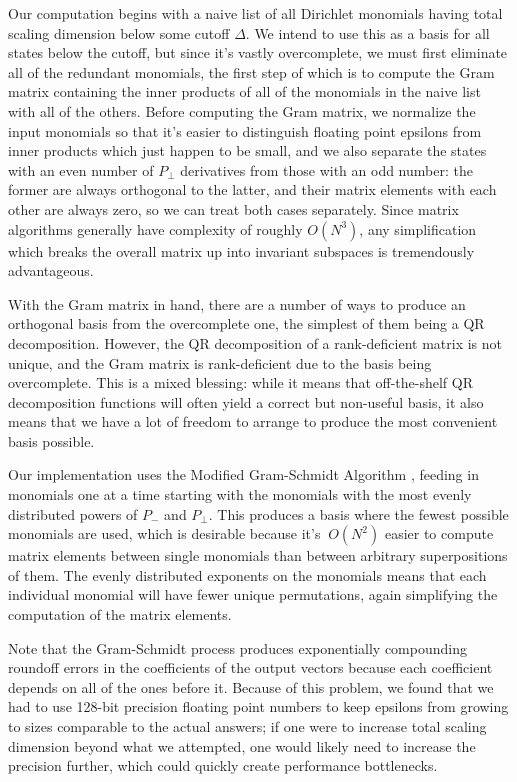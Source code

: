 \begin{subappendices}
Our computation begins with a naive list of all Dirichlet monomials having total 
scaling dimension below some cutoff $\Delta$. We intend to use this as a basis
for all states below the cutoff, but since it's vastly overcomplete, we must 
first eliminate all of the redundant monomials, the first step of which is to 
compute the Gram matrix containing the inner products of all of the monomials in 
the naive list with all of the others. Before computing the Gram matrix, we 
normalize the input monomials so that it's easier to distinguish floating point 
epsilons from inner products which just happen to be small, and we also separate
the states with an even number of $P_\perp$ derivatives from those with an odd
number: the former are always orthogonal to the latter, and their matrix 
elements with each other are always zero, so we can treat both cases separately.
Since matrix algorithms generally have complexity of roughly $O(N^3)$, any
simplification which breaks the overall matrix up into invariant subspaces is 
tremendously advantageous.

With the Gram matrix in hand, there are a number of ways to produce an 
orthogonal basis from the overcomplete one, the simplest of them being a QR
decomposition. However, the QR decomposition of a rank-deficient matrix is not
unique, and the Gram matrix is rank-deficient due to the basis being 
overcomplete. This is a mixed blessing: while it means that off-the-shelf QR
decomposition functions will often yield a correct but non-useful basis, it also
means that we have a lot of freedom to arrange to produce the most convenient
basis possible.

Our implementation uses the Modified Gram-Schmidt Algorithm 
\cite{Code:ModGramSchmidt}, feeding in monomials one at a time starting with the
monomials with the most evenly distributed powers of $P_-$ and $P_\perp$. This
produces a basis where the fewest possible monomials are used, which is 
desirable because it's $~O(N^2)$ easier to compute matrix elements between 
single monomials than between arbitrary superpositions of them. The evenly 
distributed exponents on the monomials means that each individual monomial will
have fewer unique permutations, again simplifying the computation of the matrix
elements.

Note that the Gram-Schmidt process produces exponentially compounding roundoff
errors in the coefficients of the output vectors because each coefficient 
depends on all of the ones before it. Because of this problem, we found that we
had to use 128-bit precision floating point numbers to keep epsilons from 
growing to sizes comparable to the actual answers; if one were to increase total 
scaling dimension beyond what we attempted, one would likely need to increase
the precision further, which could quickly create performance bottlenecks.


\end{subappendices}
